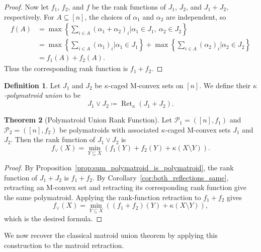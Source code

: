 \documentclass[11pt]{article}
\theoremstyle{definition}
\newtheorem{theorem}{Theorem}[section]
\newtheorem{definition}[theorem]{Definition}
\theoremstyle{remark}
\DeclareMathOperator{\Ret}{Ret}                %
\newcommand{\RetK}{\Ret_{\kappa}}              %
\begin{document}
\begin{proof}
    Now let $f_1$, $f_2$, and $f$ be the rank functions of $J_1$, $J_2$,
    and $J_1+J_2$, respectively. For $A\subseteq[n]$, the choices of
    $\alpha_1$ and $\alpha_2$ are independent, so
    \begin{align*}
        f(A)
        &=
        \max\left\{
            \sum_{i\in A}(\alpha_1+\alpha_2)_i
            \mathrel{\Big|}
            \alpha_1\in J_1,\ \alpha_2\in J_2
        \right\}\\
        &=
        \max\left\{
            \sum_{i\in A}(\alpha_1)_i
            \mathrel{\Big|}
            \alpha_1\in J_1
        \right\}
        +
        \max\left\{
            \sum_{i\in A}(\alpha_2)_i
            \mathrel{\Big|}
            \alpha_2\in J_2
        \right\}\\
        &=f_1(A)+f_2(A).
    \end{align*}
    Thus the corresponding rank function is $f_1+f_2$.
\end{proof}

\begin{definition}
    Let $J_1$ and $J_2$ be $\kappa$-caged M-convex sets on $[n]$. We
    define their \emph{$\kappa$-polymatroid union} to be
    \[
        J_1\vee J_2\coloneqq\RetK(J_1+J_2).
    \]
\end{definition}

\begin{theorem}[Polymatroid Union Rank Function]
\label{thm:polymatroid_union_rank}
    Let $\mathcal{P}_1=([n],f_1)$ and
    $\mathcal{P}_2=([n],f_2)$ be polymatroids with associated
    $\kappa$-caged M-convex sets $J_1$ and $J_2$. Then the rank function
    of $J_1\vee J_2$ is
    \[
        f_\vee(X)
        =
        \min_{Y\subseteq X}
        \left(
            f_1(Y)+f_2(Y)+\kappa(X\setminus Y)
        \right).
    \]
\end{theorem}

\begin{proof}
    By Proposition~\ref{prop:sum_polymatroid_is_polymatroid}, the rank
    function of $J_1+J_2$ is $f_1+f_2$. By
    Corollary~\ref{cor:both_reflections_same}, retracting an M-convex set
    and retracting its corresponding rank function give the same
    polymatroid. Applying the rank-function retraction to $f_1+f_2$ gives
    \[
        f_\vee(X)
        =
        \min_{Y\subseteq X}
        \left(
            (f_1+f_2)(Y)+\kappa(X\setminus Y)
        \right),
    \]
    which is the desired formula.
\end{proof}

We now recover the classical matroid union theorem by applying this
construction to the matroid retraction.
\end{document}
